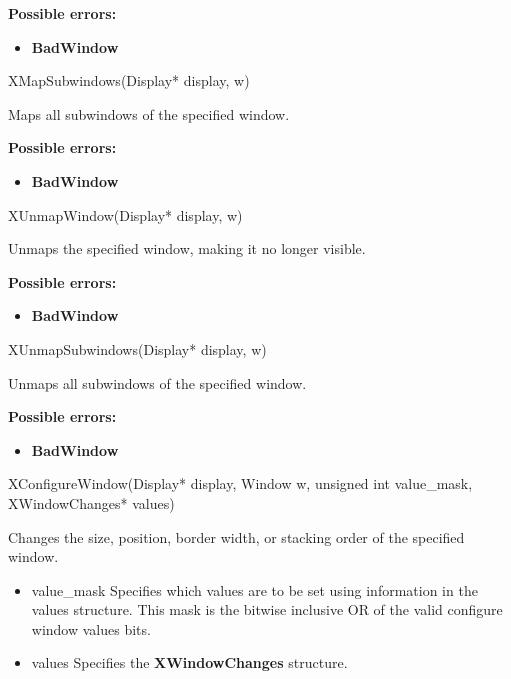\documentclass{report}
\begin{document}
\begin{itemize}
            \bigbreak \noindent
            \textbf{Possible errors:}
            \begin{itemize}
                \item \textbf{BadWindow}
            \end{itemize}

            \begin{cppcode}
                XMapSubwindows(Display* display, w)
            \end{cppcode}
            \bigbreak \noindent
            Maps all subwindows of the specified window.

            \bigbreak \noindent
            \textbf{Possible errors:}
            \begin{itemize}
                \item \textbf{BadWindow}
            \end{itemize}

            \begin{cppcode}
                XUnmapWindow(Display* display, w)
            \end{cppcode}
            \bigbreak \noindent
            Unmaps the specified window, making it no longer visible.

            \bigbreak \noindent
            \textbf{Possible errors:}
            \begin{itemize}
                \item \textbf{BadWindow}
            \end{itemize}

            \begin{cppcode}
                XUnmapSubwindows(Display* display, w)
            \end{cppcode}
            \bigbreak \noindent
            Unmaps all subwindows of the specified window.

            \bigbreak \noindent
            \textbf{Possible errors:}
            \begin{itemize}
                \item \textbf{BadWindow}
            \end{itemize}

            \begin{cppcode}
                XConfigureWindow(Display* display, Window w, unsigned int value_mask, XWindowChanges* values)
            \end{cppcode}
            \bigbreak \noindent
            Changes the size, position, border width, or stacking order of the specified window.
            \begin{itemize}
                \item value\_mask Specifies which values are to be set using information in the values structure. This mask is the bitwise inclusive OR of the valid configure window values bits.
                \item values Specifies the \textbf{XWindowChanges} structure.
            \end{itemize}


\end{itemize}
\end{document}
